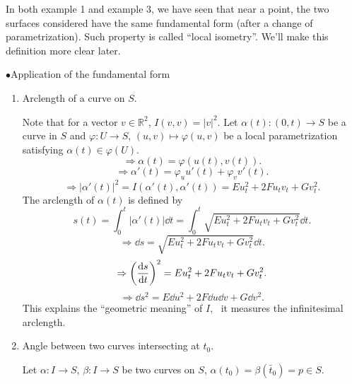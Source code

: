 \begin{remark}
    In both example 1 and example 3, we have seen that near a point, 
    the two surfaces considered have the same  
    fundamental form
     (after a change of parametrization). Such property is called
      ``local isometry''. We'll make this definition more clear later.
\end{remark}

\(\bullet\)Application of the  fundamental form

\begin{enumerate}[(1)]
    \item Arclength of a curve on \(S\).
    
    Note that for a vector \(v\in \mathbb{R}^2\), \(I(v,v)=|v|^2\).
    Let \(\alpha(t)\colon (0,t)\to S\) be a curve in \(S\) and 
    \(\varphi \colon U\to S\), \((u,v)\mapsto\varphi (u,v)\) be a 
    local parametrization satisfying 
    \(\alpha(t)\in \varphi(U)\).
    \[
    \Rightarrow \alpha(t)=\varphi\left(u(t),v(t)\right) .   
    \]
    \[
      \Rightarrow\alpha'(t)=\varphi_u u'(t)+\varphi_v v'(t) .
    \]
    \[\Rightarrow \left|\alpha'(t)\right|^2=
    I\left(\alpha'(t),\alpha'(t)\right)=E u_t^2+2F u_t v_t +G v_t^2.\]
    The arclength of \(\alpha(t)\) is defined by 
    \[
        s(t)=\int_0^t  \left|\alpha'(t)\right|\dd t
        =\int_0^t \sqrt{E u_t^2+2F u_t v_t +G v_t^2}\dd t  .
    \]
    \[
        \Rightarrow \dd s=\sqrt{E u_t^2+2F u_t v_t +G v_t^2}\dd t.
    \]
    \[
        \Rightarrow\left(\dv{s}{t}\right)^2=E u_t^2+2F u_t v_t +G v_t^2.
    \]
    \[
        \Rightarrow \dd s^2=E \dd u^2+2F \dd u \dd v +G \dd v^2    .
    \]
    This explains the ``geometric meaning'' of \(I\), \ie\ it measures 
    the infinitesimal arclength.
    \item Angle between two curves intersecting at \(t_0\).
    
    Let \(\alpha\colon I\to S\), \(\beta\colon I\to S\) be two curves 
    on \(S\), \(\alpha(t_0)=\beta(\bar{t}_0)=p\in S\). 
    \begin{center}
        



\begin{tikzpicture}[x=0.75pt,y=0.75pt,yscale=-1,xscale=1]


\end{tikzpicture}
\end{center}
\end{enumerate}
